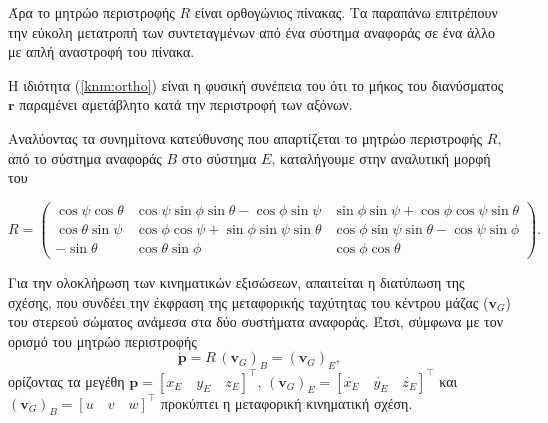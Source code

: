 Άρα το μητρώο περιστροφής \(R\) είναι ορθογώνιος πίνακας. Τα παραπάνω επιτρέπουν
την εύκολη μετατροπή των συντεταγμένων από ένα σύστημα αναφοράς σε ένα άλλο με 
απλή αναστροφή του πίνακα.

Η ιδιότητα (\ref{knm:ortho}) είναι η φυσική συνέπεια του ότι το μήκος του 
διανύσματος \(\mathbf{r}\) παραμένει αμετάβλητο κατά την περιστροφή των αξόνων.

Αναλύοντας τα συνημίτονα κατεύθυνσης που απαρτίζεται το μητρώο περιστροφής $R$, 
από το σύστημα αναφοράς $B$ στο σύστημα $E$, καταλήγουμε στην αναλυτική μορφή 
του

\begin{equation*}
    R = 
    \begin{pmatrix}
        \cos\psi \cos\theta & \cos\psi \sin\phi \sin\theta - \cos\phi \sin\psi
            & \sin\phi \sin\psi + \cos\phi \cos\psi \sin\theta \\
        \cos\theta \sin\psi & \cos\phi \cos\psi + \sin\phi \sin\psi \sin\theta
            & \cos\phi \sin\psi \sin\theta - \cos\psi \sin\phi \\
        -\sin\theta & \cos\theta \sin\phi & \cos\phi \cos\theta 
    \end{pmatrix}.
\end{equation*}

Για την ολοκλήρωση των κινηματικών εξισώσεων, απαιτείται η διατύπωση της σχέσης, 
που συνδέει την έκφραση της μεταφορικής ταχύτητας του κέντρου μάζας 
($\mathbf{v}_G$) του στερεού σώματος ανάμεσα στα δύο συστήματα αναφοράς. Έτσι, 
σύμφωνα με τον ορισμό του μητρώο περιστροφής
\begin{equation}
    \dot{\mathbf{p}} = R\, (\mathbf{v}_{G})_{B} = (\mathbf{v}_{G})_{E}
    \label{knm:trans_knm},
\end{equation}
ορίζοντας τα μεγέθη 
$\mathbf{p} = [{x_{E}} \quad {y_{E}} \quad {z_{E}}]^\intercal$, 
$(\mathbf{v}_{G})_{E} = [\dot{x_{E}} \quad \dot{y_{E}} \quad 
    \dot{z_{E}}]^\intercal$ και 
$(\mathbf{v}_{G})_{B} = [u \quad v \quad w]^\intercal$
προκύπτει η μεταφορική κινηματική σχέση.